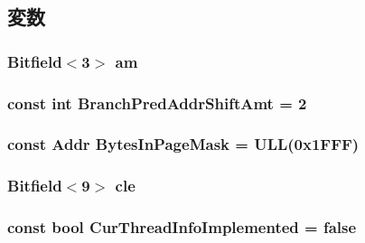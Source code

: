 \subsection{変数}
\hypertarget{namespaceSparcISA_a221d874609a3a07e22447f60e33cffdb}{
\subsubsection[{am}]{\setlength{\rightskip}{0pt plus 5cm}Bitfield$<$3$>$ {\bf am}}}
\label{namespaceSparcISA_a221d874609a3a07e22447f60e33cffdb}
\hypertarget{namespaceSparcISA_a518c446960e93d236b89246eabc20298}{
\subsubsection[{BranchPredAddrShiftAmt}]{\setlength{\rightskip}{0pt plus 5cm}const int {\bf BranchPredAddrShiftAmt} = 2}}
\label{namespaceSparcISA_a518c446960e93d236b89246eabc20298}
\hypertarget{namespaceSparcISA_aa9425c8366e078ba79a7d9730ad25492}{
\subsubsection[{BytesInPageMask}]{\setlength{\rightskip}{0pt plus 5cm}const {\bf Addr} {\bf BytesInPageMask} = ULL(0x1FFF)}}
\label{namespaceSparcISA_aa9425c8366e078ba79a7d9730ad25492}
\hypertarget{namespaceSparcISA_a4aab5f0f9a9d6bace69a277372b64776}{
\subsubsection[{cle}]{\setlength{\rightskip}{0pt plus 5cm}Bitfield$<$9$>$ {\bf cle}}}
\label{namespaceSparcISA_a4aab5f0f9a9d6bace69a277372b64776}
\hypertarget{namespaceSparcISA_a9faf3aac879cfa867d4ae15d4119c45e}{
\subsubsection[{CurThreadInfoImplemented}]{\setlength{\rightskip}{0pt plus 5cm}const bool {\bf CurThreadInfoImplemented} = false}}
